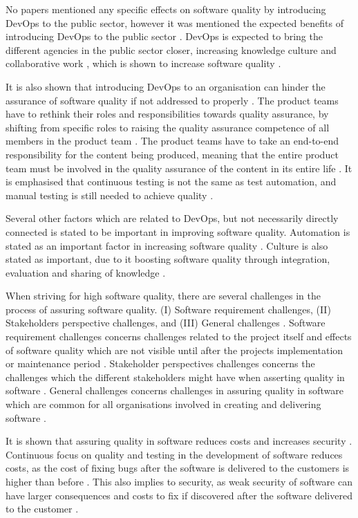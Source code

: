 No papers mentioned any specific effects on software quality by introducing DevOps to the public sector, however it was mentioned the expected benefits of introducing DevOps to the public sector \cite{mm_2021}. DevOps is expected to bring the different agencies in the public sector closer, increasing knowledge culture and collaborative work \cite{mm_2021}, which is shown to increase software quality \cite{smm_2018}.

It is also shown that introducing DevOps to an organisation can hinder the assurance of software quality if not addressed to properly \cite{dsc_2019}. The product teams have to rethink their roles and responsibilities towards quality assurance, by shifting from specific roles to raising the quality assurance competence of all members in the product team \cite{dsc_2019}. The product teams have to take an end-to-end responsibility for the content being produced, meaning that the entire product team must be involved in the quality assurance of the content in its entire life \cite{dsc_2019}. It is emphasised that continuous testing is not the same as test automation, and manual testing is still needed to achieve quality \cite{dsc_2019}.

Several other factors which are related to DevOps, but not necessarily directly connected is stated to be important in improving software quality. Automation is stated as an important factor in increasing software quality \cite{smm_2018}. Culture is also stated as important, due to it boosting software quality through integration, evaluation and sharing of knowledge \cite{smm_2018}.

When striving for high software quality, there are several challenges in the process of assuring software quality. (I) Software requirement challenges, (II) Stakeholders perspective challenges, and (III) General challenges \cite{sh_2018}. Software requirement challenges concerns challenges related to the project itself and effects of software quality which are not visible until after the projects implementation or maintenance period \cite{sh_2018}. Stakeholder perspectives challenges concerns the challenges which the different stakeholders might have when asserting quality in software \cite{sh_2018}. General challenges concerns challenges in assuring quality in software which are common for all organisations involved in creating and delivering software \cite{sh_2018}.

It is shown that assuring quality in software reduces costs and increases security \cite{csw_2011}\cite{sh_2018}. Continuous focus on quality and testing in the development of software reduces costs, as the cost of fixing bugs after the software is delivered to the customers is higher than before \cite{sh_2018}\cite{csw_2011}. This also implies to security, as weak security of software can have larger consequences and costs to fix if discovered after the software delivered to the customer \cite{csw_2011}. 

